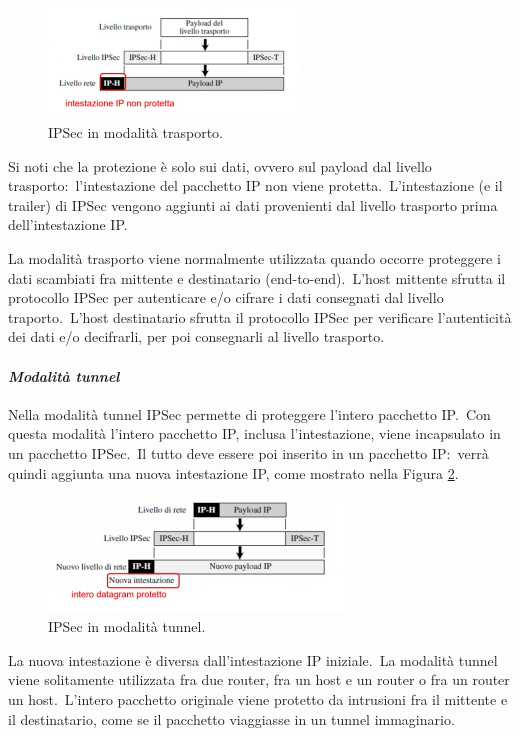 \begin{figure}[H]
    \centering
    \includegraphics[width=0.6\textwidth]{immagini/mod_trasporto.jpg}
    \caption{IPSec in modalità trasporto.}
    \label{fig:traporto}
\end{figure}
Si noti che la protezione è solo sui dati, ovvero sul payload dal livello trasporto:\ l'intestazione del pacchetto IP non viene protetta.\
L'intestazione (e il trailer) di IPSec vengono aggiunti ai dati provenienti dal livello trasporto prima dell'intestazione IP.

La modalità trasporto viene normalmente utilizzata quando occorre proteggere i dati scambiati fra mittente e destinatario (end-to-end).\
L'host mittente sfrutta il protocollo IPSec per autenticare e/o cifrare i dati consegnati dal livello traporto.\
L'host destinatario sfrutta il protocollo IPSec per verificare l'autenticità dei dati e/o decifrarli, per poi consegnarli al livello trasporto.

\paragraph{\textit{Modalità tunnel}}

Nella modalità tunnel IPSec permette di proteggere l'intero pacchetto IP.\
Con questa modalità l'intero pacchetto IP, inclusa l'intestazione, viene incapsulato in un pacchetto IPSec.\
Il tutto deve essere poi inserito in un pacchetto IP:\ verrà quindi aggiunta una nuova intestazione IP, come mostrato nella Figura \ref{fig:tunnel}.

\begin{figure}[H]
    \centering
    \includegraphics[width=0.7\textwidth]{immagini/mod_tunnel.jpg}
    \caption{IPSec in modalità tunnel.}
    \label{fig:tunnel}
\end{figure}
La nuova intestazione è diversa dall'intestazione IP iniziale.\
La modalità tunnel viene solitamente utilizzata fra due router, fra un host e un router o fra un router un host.\
L'intero pacchetto originale viene protetto da intrusioni fra il mittente e il destinatario, come se il pacchetto viaggiasse in un tunnel immaginario.

